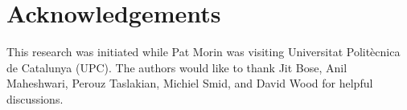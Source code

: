 \documentclass{dmtcs}
\begin{document}
\section*{Acknowledgements}

This research was initiated while Pat Morin was visiting Universitat
Polit\`ecnica de Catalunya (UPC). 
The authors would like to thank Jit Bose, Anil Maheshwari, Perouz
Taslakian, Michiel Smid, and David Wood for helpful discussions.



\end{document}

